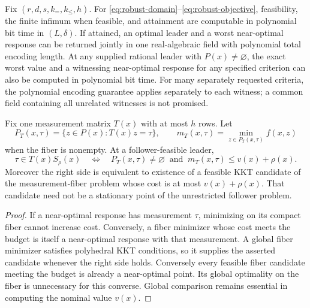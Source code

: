 \begin{samepage}
\begin{theorem}\label{thm:nearoptimal-robust}
Fix $(r,d,s,k_=,k_{\le},h)$. For
\eqref{eq:robust-domain}--\eqref{eq:robust-objective}, feasibility, the
finite infimum when feasible, and attainment are computable in polynomial
bit time in $(L,\delta)$. If attained, an optimal leader and a worst
near-optimal response can be returned jointly in one real-algebraic field
with polynomial total encoding length. At any supplied rational leader
with $P(x)\ne\varnothing$, the exact worst value and a witnessing
near-optimal response for any specified criterion can also be computed
in polynomial bit time. For many separately requested criteria, the
polynomial encoding guarantee applies separately to each witness;
a common field containing all unrelated witnesses is not promised.
\end{theorem}
\end{samepage}

\begin{lemma}\label{lem:measurement-threshold}
Fix one measurement matrix $T(x)$ with at most $h$ rows. Let
\[
 P_T(x,\tau)=\{z\in P(x):T(x)z=\tau\},\qquad
 m_T(x,\tau)=\min_{z\in P_T(x,\tau)} f(x,z)
\]
when the fiber is nonempty. At a follower-feasible leader,
\begin{equation}\label{eq:measurement-threshold}
 \tau\in T(x)S_\rho(x)\quad\Longleftrightarrow\quad
 P_T(x,\tau)\ne\varnothing\ \text{ and }\
                       m_T(x,\tau)\le v(x)+\rho(x).
\end{equation}
Moreover the right side is equivalent to existence of a feasible KKT
candidate of the measurement-fiber problem whose cost is at most
$v(x)+\rho(x)$. That candidate need not be a stationary point of the
unrestricted follower problem.
\end{lemma}
\begin{proof}
If a near-optimal response has measurement $\tau$, minimizing on its
compact fiber cannot increase cost. Conversely, a fiber minimizer whose
cost meets the budget is itself a near-optimal response with that
measurement. A global fiber minimizer satisfies polyhedral KKT conditions,
so it supplies the asserted candidate whenever the right side holds.
Conversely every feasible fiber candidate meeting the budget is already
a near-optimal point. Its global optimality on the fiber is unnecessary
for this converse. Global comparison remains essential in computing the
nominal value $v(x)$.
\end{proof}

